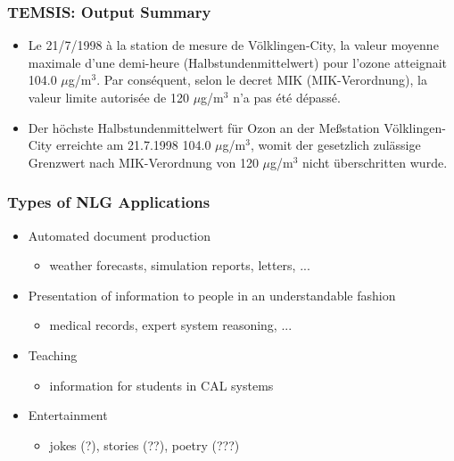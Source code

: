 \documentclass[compress,color=usenames]{beamer}
\begin{document}
\begin{frame}
\frametitle{TEMSIS: Output Summary}

\begin{itemize}
\item Le 21/7/1998 \`a la station de mesure de V\"olklingen-City, la valeur moyenne maximale d'une demi-heure (Halbstundenmittelwert) pour l'ozone atteignait 104.0 $\mu$g/m${}^3$. Par cons\'equent, selon le decret MIK (MIK-Verordnung), la valeur limite autoris\'ee de 120 $\mu$g/m${}^3$ n'a pas \'et\'e d\'epass\'e.

\item Der h\"ochste Halbstundenmittelwert f\"ur Ozon an der Me{\ss}station V\"olklingen-City erreichte 
am 21.7.1998 104.0 $\mu$g/m${}^3$, womit der gesetzlich zul\"assige Grenzwert nach MIK-Verordnung von 
120 $\mu$g/m${}^3$ nicht \"uberschritten wurde.
\end{itemize}

\end{frame}

\begin{frame}
\frametitle{Types of NLG Applications}

\label{f40}
\begin{itemize}
\item { {Automated document production}}
\begin{itemize}
\item weather forecasts, simulation reports, letters, ...
\end{itemize}
\item { {Presentation of information to people in an understandable fashion}}
\begin{itemize}
\item medical records, expert system reasoning, ...
\end{itemize}
\item { {Teaching}}
\begin{itemize}
\item information for students in CAL systems
\end{itemize}
\item { {Entertainment}}
\begin{itemize}
\item jokes (?), stories (??), poetry (???)
\end{itemize}
\end{itemize}

\end{frame}
\end{document}
